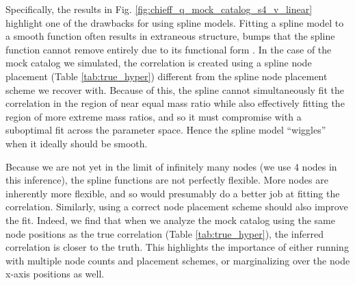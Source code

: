 \documentclass[%
 reprint,
 amsmath,amssymb,
 aps,
 prd,
]{revtex4-2}
\newcommand{\chieff}{\chi_{\rm eff}}
\begin{document}
Specifically, the results in Fig. \ref{fig:chieff_q_mock_catalog_s4_v_linear} highlight one of the drawbacks for using spline models. Fitting a spline model to a smooth function often results in extraneous structure, bumps that the spline function cannot remove entirely due to its functional form \cite{Farah:2023vsc}. In the case of the mock catalog we simulated, the correlation is created using a spline node placement (Table \ref{tab:true_hyper}) different from the spline node placement scheme we recover with. Because of this, the spline cannot simultaneously fit the correlation in the region of near equal mass ratio while also effectively fitting the region of more extreme mass ratios, and so it must compromise with a suboptimal fit across the parameter space. Hence the spline model ``wiggles'' when it ideally should be smooth.  %

Because we are not yet in the limit of infinitely many nodes (we use 4 nodes in this inference), the spline functions are not perfectly flexible. More nodes are inherently more flexible, and so would presumably do a better job at fitting the correlation. Similarly, using a correct node placement scheme should also improve the fit. Indeed, we find that when we analyze the mock catalog using the same node positions as the true correlation (Table \ref{tab:true_hyper}), the inferred correlation is closer to the truth. This highlights the importance of either running with multiple node counts and placement schemes, or marginalizing over the node x-axis positions as well.


\end{document}
